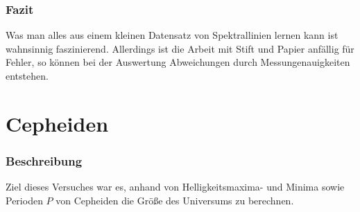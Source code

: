 \documentclass[12pt]{article}
\begin{document}
\newpage\noindent\subsubsection*{Fazit}
Was man alles aus einem kleinen Datensatz von Spektrallinien lernen kann ist wahnsinnig faszinierend. Allerdings ist die Arbeit mit Stift und Papier anfällig für Fehler, so können bei der Auswertung Abweichungen durch Messungenauigkeiten entstehen.\\
\section{Cepheiden}
\subsubsection*{Beschreibung}
Ziel dieses Versuches war es, anhand von Helligkeitsmaxima- und Minima sowie Perioden $P$ von Cepheiden die Größe des Universums zu berechnen.
\end{document}
